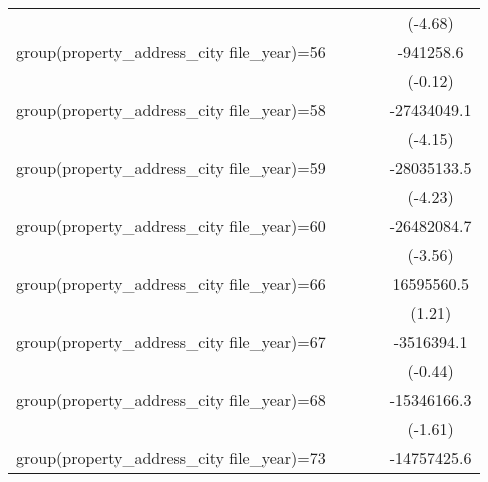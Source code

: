 {\begin{tabular}{l*{4}{c}}
                    &                     &                     &                     &     (-4.68)         \\
\addlinespace
group(property\_address\_city file\_year)=56&                     &                     &                     &   -941258.6         \\
                    &                     &                     &                     &     (-0.12)         \\
\addlinespace
group(property\_address\_city file\_year)=58&                     &                     &                     & -27434049.1\sym{***}\\
                    &                     &                     &                     &     (-4.15)         \\
\addlinespace
group(property\_address\_city file\_year)=59&                     &                     &                     & -28035133.5\sym{***}\\
                    &                     &                     &                     &     (-4.23)         \\
\addlinespace
group(property\_address\_city file\_year)=60&                     &                     &                     & -26482084.7\sym{***}\\
                    &                     &                     &                     &     (-3.56)         \\
\addlinespace
group(property\_address\_city file\_year)=66&                     &                     &                     &  16595560.5         \\
                    &                     &                     &                     &      (1.21)         \\
\addlinespace
group(property\_address\_city file\_year)=67&                     &                     &                     &  -3516394.1         \\
                    &                     &                     &                     &     (-0.44)         \\
\addlinespace
group(property\_address\_city file\_year)=68&                     &                     &                     & -15346166.3         \\
                    &                     &                     &                     &     (-1.61)         \\
\addlinespace
group(property\_address\_city file\_year)=73&                     &                     &                     & -14757425.6\sym{*}  \\

\end{tabular}}
